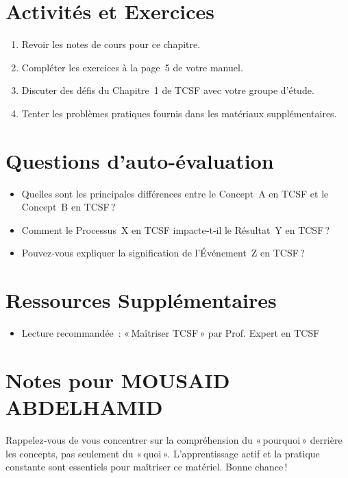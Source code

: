 \documentclass{article}
\begin{document}
	\section*{Activités et Exercices}
	\begin{enumerate}
		\item Revoir les notes de cours pour ce chapitre.
		\item Compléter les exercices à la page 5 de votre manuel.
		\item Discuter des défis du Chapitre 1 de TCSF avec votre groupe d'étude.
		\item Tenter les problèmes pratiques fournis dans les matériaux supplémentaires.
	\end{enumerate}
	
	\section*{Questions d'auto-évaluation}
	\begin{itemize}
		\item Quelles sont les principales différences entre le Concept A en TCSF et le Concept B en TCSF ?
		\item Comment le Processus X en TCSF impacte‑t‑il le Résultat Y en TCSF ?
		\item Pouvez‑vous expliquer la signification de l'Événement Z en TCSF ?
	\end{itemize}
	
	\section*{Ressources Supplémentaires}
	\begin{itemize}
		\item Lecture recommandée : « Maîtriser TCSF » par Prof. Expert en TCSF
	\end{itemize}
	
	\section*{Notes pour MOUSAID ABDELHAMID}
	Rappelez‑vous de vous concentrer sur la compréhension du « pourquoi »  
	derrière les concepts, pas seulement du « quoi ».  
	L'apprentissage actif et la pratique constante sont essentiels pour maîtriser ce matériel.  
	Bonne chance !
	
\end{document}
